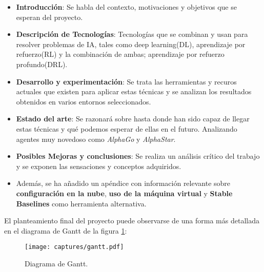 \documentclass[11pt,fleqn]{book} %
\begin{document}
\begin{itemize}
	\item \textbf{Introducción}: Se habla del contexto, motivaciones y objetivos que se esperan del proyecto. \\
	
	\item \textbf{Descripción de Tecnologías}: Tecnologías que se combinan y usan para resolver problemas de IA, tales como deep learning(DL), aprendizaje por refuerzo(RL) y la combinación de ambas; aprendizaje por refuerzo profundo(DRL).\\
	
	\item \textbf{Desarrollo y experimentación}: Se trata las herramientas y recuros actuales que existen para aplicar estas técnicas y se analizan los resultados obtenidos en varios entornos seleccionados.\\
	
	\item \textbf{Estado del arte}: Se razonará sobre hasta donde han sido capaz de llegar estas técnicas y qué podemos esperar de ellas en el futuro. Analizando agentes muy novedoso como \textit{AlphaGo} y \textit{AlphaStar}. \\
	
	\item \textbf{Posibles Mejoras y conclusiones}: Se realiza un análisis crítico del trabajo y se exponen las sensaciones y conceptos adquiridos. \\
	
	\item Además, se ha añadido un apéndice con información relevante sobre \textbf{configuración en la nube}, \textbf{uso de la máquina virtual} y \textbf{Stable Baselines} como herramienta alternativa.
\end{itemize}

El planteamiento final del proyecto puede observarse de una forma más detallada en el diagrama de Gantt de la figura \ref{fig:gantt}:

\begin{figure}[H]
	\centering\texttt{[image: captures/gantt.pdf]}
	\caption{Diagrama de Gantt.}
	\label{fig:gantt} %
\end{figure}

\end{document}
